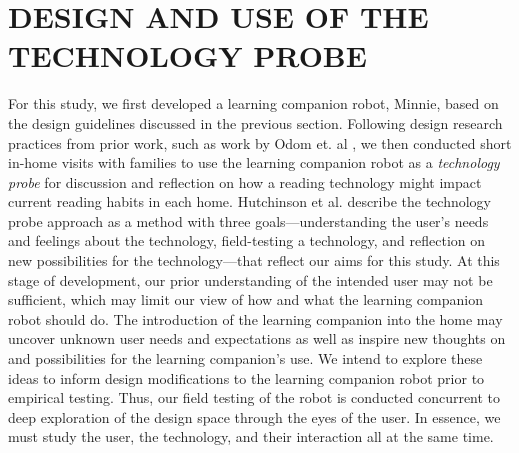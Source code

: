 \documentclass{sigchi}
\begin{document}



\section{DESIGN AND USE OF THE TECHNOLOGY PROBE}
 For this study, we first developed a learning companion robot, Minnie, based on the design guidelines discussed in the previous section. Following design research practices from prior work, such as work by Odom et. al \cite{Odom:2012}, we then conducted short in-home visits with families to use the learning companion robot as a \textit{technology probe} \cite{Hutchinson:2003} for discussion and reflection on how a reading technology might impact current reading habits in each home. Hutchinson et al. \cite{Hutchinson:2003} describe the technology probe approach as a method with three goals---understanding the user's needs and feelings about the technology, field-testing a technology, and reflection on new possibilities for the technology---that reflect our aims for this study. At this stage of development, our prior understanding of the intended user may not be sufficient, which may limit our view of how and what the learning companion robot should do. The introduction of the learning companion into the home may uncover unknown user needs and expectations as well as inspire new thoughts on and possibilities for the learning companion's use. We intend to explore these ideas to inform design modifications to the learning companion robot prior to empirical testing. Thus, our field testing of the robot is conducted concurrent to deep exploration of the design space through the eyes of the user. In essence, we must study the user, the technology, and their interaction all at the same time.
\end{document}
